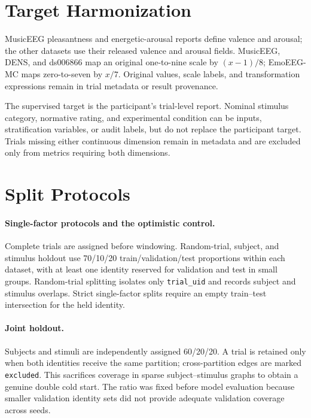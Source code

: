 \section{Target Harmonization}

MusicEEG pleasantness and energetic-arousal reports define valence and arousal;
the other datasets use their released valence and arousal fields. MusicEEG,
DENS, and ds006866 map an original one-to-nine scale by $(x-1)/8$; EmoEEG-MC
maps zero-to-seven by $x/7$. Original values, scale labels, and transformation
expressions remain in trial metadata or result provenance.

The supervised target is the participant's trial-level report. Nominal stimulus
category, normative rating, and experimental condition can be inputs,
stratification variables, or audit labels, but do not replace the participant
target. Trials missing either continuous dimension remain in metadata and are
excluded only from metrics requiring both dimensions.

\section{Split Protocols}
\label{app:splits}

\paragraph{Single-factor protocols and the optimistic control.}
Complete trials are assigned before windowing. Random-trial, subject, and
stimulus holdout use 70/10/20 train/validation/test proportions within each
dataset, with at least one identity reserved for validation and test in small
groups. Random-trial splitting isolates only \texttt{trial\_uid} and records
subject and stimulus overlaps. Strict single-factor splits require an empty
train--test intersection for the held identity.

\paragraph{Joint holdout.}
Subjects and stimuli are independently assigned 60/20/20. A trial is retained
only when both identities receive the same partition; cross-partition edges are
marked \texttt{excluded}. This sacrifices coverage in sparse subject--stimulus
graphs to obtain a genuine double cold start. The ratio was fixed before model
evaluation because smaller validation identity sets did not provide adequate
validation coverage across seeds.

